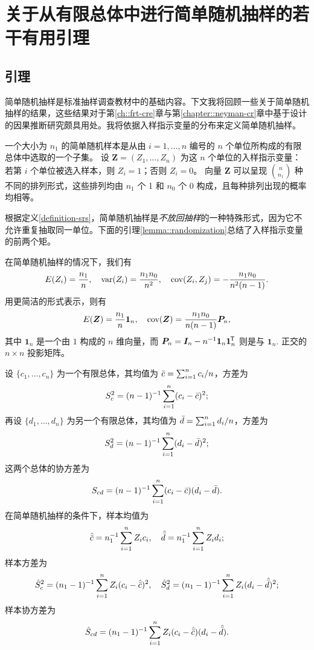
\chapter{关于从有限总体中进行简单随机抽样的若干有用引理}
 \label{chapter::SRS-appendix}

\section{引理}
 
简单随机抽样是标准抽样调查教材中的基础内容\citep[e.g.,][]{cochran1953}。下文我将回顾一些关于简单随机抽样的结果，这些结果对于第\ref{ch::frt-cre}章与第\ref{chapter::neyman-cr}章中基于设计的因果推断研究颇具用处。我将依据入样指示变量的分布来定义简单随机抽样。 


\begin{definition}
[简单随机抽样]\label{definition-srs}
一个大小为 $n_1$ 的简单随机样本是从由 $i=1,\ldots, n$ 编号的 $n$ 个单位所构成的有限总体中选取的一个子集。  
设 $\bm{Z} = (Z_1, \ldots, Z_n)$ 为这 $n$ 个单位的入样指示变量：若第 $i$ 个单位被选入样本，则 $Z_i=1$；否则 $Z_i=0$。  
向量 $\bm{Z}$ 可以呈现 $\binom{n}{n_1}$ 种不同的排列形式，这些排列均由 $n_1$ 个 1 和 $n_0$ 个 0 构成，且每种排列出现的概率均相等。
\end{definition}

根据定义\ref{definition-srs}，简单随机抽样是{\it 不放回抽样}的一种特殊形式，因为它不允许重复抽取同一单位。下面的引理\ref{lemma::randomization}总结了入样指示变量的前两个矩。 

 

\begin{lemma}
\label{lemma::randomization}
在简单随机抽样的情况下，我们有  
$$
E ( Z_i )  = \frac{n_1}{ n}, \quad 
\textup{var}(Z_i) = \frac{  n_1 n_0 }{n^2}, \quad 
\textup{cov}(Z_i, Z_j) = - \frac{n_1 n_0 } { n^2 (n-1)  }.
$$  
用更简洁的形式表示，则有  
$$
E(\bm{Z}) = \frac{n_1}{n} \bm{1}_n,\quad
\textup{cov}(\bm{Z}) = \frac{n_1n_0}{n(n-1)} \bm{P}_n,
$$  
其中 $ \bm{1}_n$ 是一个由 $1$ 构成的 $n$ 维向量，而 $\bm{P}_n = \bm{I}_n  - n^{-1} \bm{1}_n \bm{1}_n^{\mkern-1.5mu\mathsf{T}} $ 则是与 $ \bm{1}_n.$ 正交的 $n\times n$ 投影矩阵。
\end{lemma}




设 $\{ c_1, \ldots, c_n\} $ 为一个有限总体，其均值为 $ \bar{c}  = \sum_{i=1}^n c_i/n$，方差为
$$
S_c^2 = (n-1)^{-1} \sum_{i=1}^n (c_i -  \bar{c} )^2;
$$
再设 $\{  d_1, \ldots, d_n \} $ 为另一个有限总体，其均值为 $ \bar{d}   = \sum_{i=1}^n d_i/n$，方差为
$$
S_d^2 =  (n-1)^{-1}   \sum_{i=1}^n (d_i -  \bar{d}  )^2;
$$
这两个总体的协方差为
$$
S_{cd} =  (n-1)^{-1}   \sum_{i=1}^n (c_i -  \bar{c} ) (d_i -  \bar{d}  ).
$$
在简单随机抽样的条件下，样本均值为
$$
 \hat{\bar{c}}  =  n_1^{-1} \sum_{i=1}^n Z_i c_i,\quad 
 \hat{\bar{d}}   = n_1^{-1} \sum_{i=1}^n Z_i d_i;
$$
样本方差为
$$
 \hat{S}_c^2   = (n_1 - 1)^{-1} \sum_{i=1}^n Z_i (c_i -  \hat{\bar{c}} )^2,\quad 
 \hat{S}_d^2   = (n_1 - 1)^{-1}   \sum_{i=1}^n Z_i (d_i -  \hat{\bar{d}}  )^2;
$$
样本协方差为
$$
 \hat{S}_{cd}   = (n_1 - 1)^{-1}  \sum_{i=1}^n Z_i (c_i -  \hat{\bar{c}} ) (d_i -  \hat{\bar{d}}  ). 
$$

